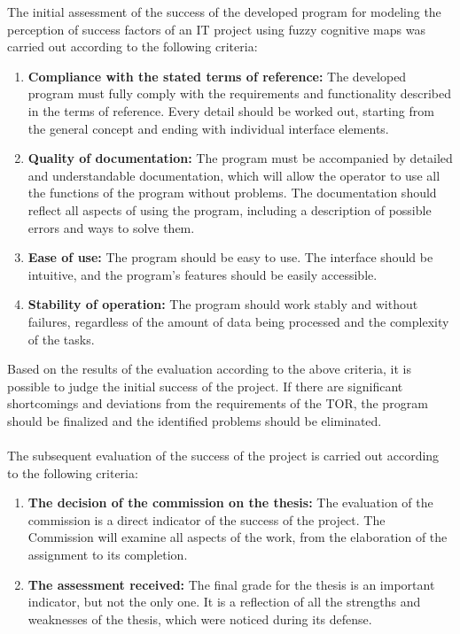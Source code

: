 \documentclass{article}
\begin{document}
\begin{minipage}{0.49\textwidth}
        The initial assessment of the success of the developed program for modeling the perception of success factors of an IT project using fuzzy cognitive maps was carried out according to the following criteria:\\
        \begin{enumerate}
            \item \textbf{Compliance with the stated terms of reference:} The developed program must fully comply with the requirements and functionality described in the terms of reference. Every detail should be worked out, starting from the general concept and ending with individual interface elements.
            \item \textbf{Quality of documentation:} The program must be accompanied by detailed and understandable documentation, which will allow the operator to use all the functions of the program without problems. The documentation should reflect all aspects of using the program, including a description of possible errors and ways to solve them.
            \item \textbf{Ease of use:} The program should be easy to use. The interface should be intuitive, and the program's features should be easily accessible.
            \item \textbf{Stability of operation:} The program should work stably and without failures, regardless of the amount of data being processed and the complexity of the tasks.
        \end{enumerate}
        Based on the results of the evaluation according to the above criteria, it is possible to judge the initial success of the project. If there are significant shortcomings and deviations from the requirements of the TOR, the program should be finalized and the identified problems should be eliminated.\\
        ~\\
        The subsequent evaluation of the success of the project is carried out according to the following criteria:
        \begin{enumerate}
            \item \textbf{The decision of the commission on the thesis:} The evaluation of the commission is a direct indicator of the success of the project. The Commission will examine all aspects of the work, from the elaboration of the assignment to its completion.

            \item \textbf{The assessment received:} The final grade for the thesis is an important indicator, but not the only one. It is a reflection of all the strengths and weaknesses of the thesis, which were noticed during its defense.


\end{enumerate}
\end{minipage}
\end{document}
